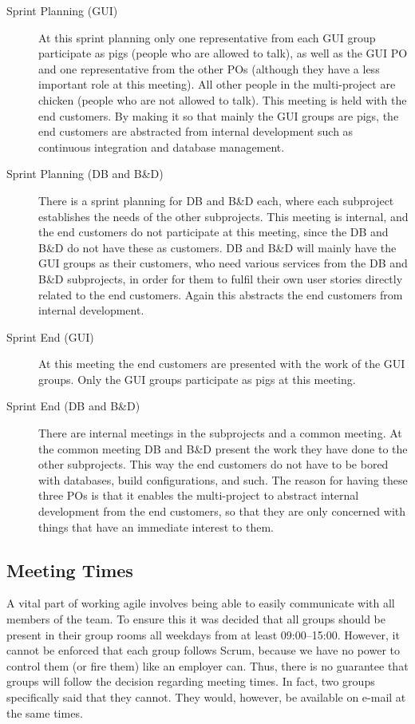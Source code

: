 \begin{description}
  \item[Sprint Planning (GUI)] At this sprint planning only one representative from each GUI group participate as pigs (people who are allowed to talk), as well as the GUI PO and one representative from the other POs (although they have a less important role at this meeting). All other people in the multi-project are chicken (people who are not allowed to talk). This meeting is held with the end customers. By making it so that mainly the GUI groups are pigs, the end customers are abstracted from internal development such as continuous integration and database management.
  \item[Sprint Planning (DB and B\&D)] There is a sprint planning for DB and B\&D each, where each subproject establishes the needs of the other subprojects. This meeting is internal, and the end customers do not participate at this meeting, since the DB and B\&D do not have these as customers. DB and B\&D will mainly  have the GUI groups as their customers, who need various services from the DB and B\&D subprojects, in order for them to fulfil their own user stories directly related to the end customers. Again this abstracts the end customers from internal development.
  \item[Sprint End (GUI)] At this meeting the end customers are presented with the work of the GUI groups. Only the GUI groups participate as pigs at this meeting.
  \item[Sprint End (DB and B\&D)] There are internal meetings in the subprojects and a common meeting. At the common meeting DB and B\&D present the work they have done to the other subprojects. This way the end customers do not have to be bored with databases, build configurations, and such. The reason for having these three POs is that it enables the multi-project to abstract internal development from the end customers, so that they are only concerned with things that have an immediate interest to them.
\end{description}

\subsection{Meeting Times}
A vital part of working agile involves being able to easily communicate with all members of the team. To ensure this it was decided that all groups should be present in their group rooms all weekdays from at least 09:00--15:00. However, it cannot be enforced that each group follows Scrum, because we have no power to control them (or fire them) like an employer can. Thus, there is no guarantee that groups will follow the decision regarding meeting times. In fact, two groups specifically said that they cannot. They would, however, be available on e-mail at the same times.

